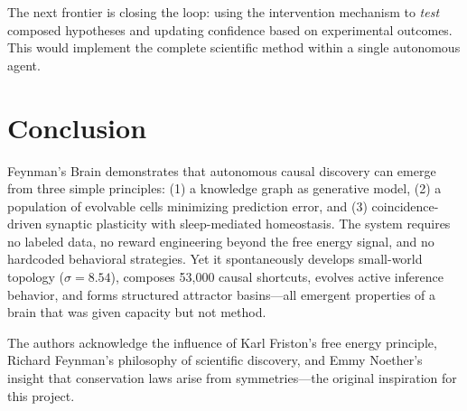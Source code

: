 \documentclass[aps,prl,reprint]{revtex4-2}
\begin{document}
The next frontier is closing the loop: using the intervention mechanism to
\emph{test} composed hypotheses and updating confidence based on experimental
outcomes. This would implement the complete scientific method within a single
autonomous agent.

\section{Conclusion}

Feynman's Brain demonstrates that autonomous causal discovery can emerge from
three simple principles: (1) a knowledge graph as generative model, (2) a
population of evolvable cells minimizing prediction error, and (3) coincidence-driven
synaptic plasticity with sleep-mediated homeostasis. The system requires no
labeled data, no reward engineering beyond the free energy signal, and no
hardcoded behavioral strategies. Yet it spontaneously develops small-world
topology ($\sigma = 8.54$), composes 53,000 causal shortcuts, evolves
active inference behavior, and forms structured attractor basins---all
emergent properties of a brain that was given capacity but not method.

\begin{acknowledgments}
The authors acknowledge the influence of Karl Friston's free energy principle,
Richard Feynman's philosophy of scientific discovery, and Emmy Noether's
insight that conservation laws arise from symmetries---the original
inspiration for this project.
\end{acknowledgments}
\end{document}
